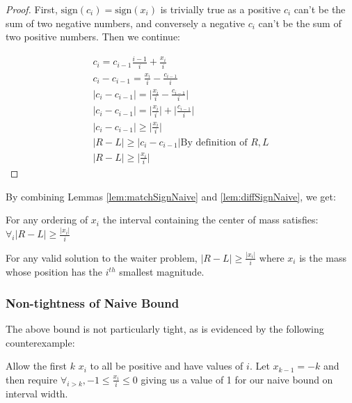\begin{proof}
First, $\textrm{sign}(c_i) = \textrm{sign}(x_i)$  is trivially true as a positive $c_i$ can't be the sum of two negative numbers, and conversely a negative $c_i$ can't be the sum of two positive numbers.  Then we continue:

\begin{eqnarray*}
c_i = c_{i-1}\frac{i-1}{i} + \frac{x_i }{ i } \\ 
c_i - c_{i-1} = \frac{x_i}{i} - \frac{c_{i-1}}{i} \\
\big|c_i - c_{i-1}\big| = \big|\frac{x_i}{i} - \frac{c_{i-1}}{i}\big| \\
\big|c_i - c_{i-1}\big| = \big|\frac{x_i}{i}\big| + \big|\frac{c_{i-1}}{i}\big| \\
\big|c_i - c_{i-1}\big| \geq \big|\frac{x_i}{i}\big|  \\
\big|R-L\big| \geq \big|c_i - c_{i-1}\big| \textrm{By definition of } R,L \\
\big|R-L\big| \geq \big|\frac{x_i }{ i }\big|
\end{eqnarray*}

\end{proof}

By combining Lemmas \ref{lem:matchSignNaive} and \ref{lem:diffSignNaive}, we get:

\begin{thm} \label{thm:naiveBound}
For any ordering of $x_i$ the interval containing the center of mass satisfies: $\forall_i \big|R-L\big| \geq \frac{\big|x_i\big|}{i} $
\end{thm}

\begin{cor} \label{cor:naiveBound}
For any valid solution to the waiter problem, $|R-L| \geq \frac{|x_i|}{i}$ where $x_i$ is the mass whose position has the $i^{th}$ smallest magnitude.
\end{cor}

\subsubsection{Non-tightness of Naive Bound} \label{subs:naiveCounter}

The above bound is not particularly tight, as is evidenced by the following counterexample:

Allow the first $k$ $x_i$ to all be positive and have values of $i$.  Let $ x_{k-1} = -k $ and then require $ \forall_{ i > k}, -1 \leq \frac{x_i}{i} \leq 0 $ giving us a value of 1 for our naive bound on interval width.

